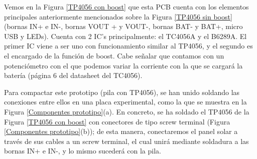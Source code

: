 \documentclass[12pt]{article}
\begin{document}
	\noindent Vemos en la Figura \ref{TP4056 con boost} que esta PCB cuenta con los elementos principales anteriormente mencionados sobre la Figura \ref{TP4056 sin boost} (bornas IN+ e IN-, bornas VOUT + y VOUT-, bornas BAT- y BAT+, micro USB y LEDs). Cuenta con 2 IC's principalmente: el TC4056A y el B6289A. El primer IC viene a ser uno con funcionamiento similar al TP4056, y el segundo es el encargado de la función de boost. Cabe señalar que contamos con un potenciómetro con el que podemos variar la corriente con la que se cargará la batería (página 6 del datasheet del TC4056). 
	

	
	\noindent Para compactar este prototipo (pila  con TP4056), se han unido soldando las conexiones entre ellos en una placa experimental, como la que se muestra en la Figura \ref{Componentes prototipo}(a). En concreto, se ha soldado el TP4056 de la Figura \ref{TP4056 con boost} con conectores de tipo screw terminal (Figura \ref{Componentes prototipo}(b)); de esta manera, conectaremos el panel solar a través de sus cables a un screw terminal, el cual unirá mediante soldadura a las bornas IN+ e IN-, y lo mismo sucederá con la pila.
	
	\pagebreak
	
\end{document}
